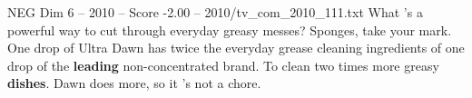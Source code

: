 \begin{textsample}{NEG Dim 6 – 2010 – Score -2.00 – 2010/tv\_com\_2010\_111.txt}  \label{ex:f6_neg_044}
What 's a powerful way to cut through everyday greasy messes?
Sponges, take your mark.
One drop of Ultra Dawn has twice the everyday grease cleaning ingredients of one drop of the \textbf{leading} non-concentrated brand.
To clean two times more greasy \textbf{dishes}.
Dawn does more, so it 's not a chore.

\end{textsample}
